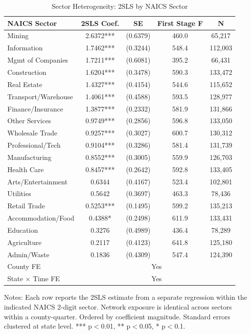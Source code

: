 \begin{table}[H]
\centering
\caption{Sector Heterogeneity: 2SLS by NAICS Sector}
\label{tab:sectorhet}
\small
\begin{tabular}{l cccc}
\toprule
NAICS Sector & 2SLS Coef. & SE & First Stage F & N \\
\midrule
Mining & 2.6372*** & (0.6379) & 460.0 & 65,217 \\
Information & 1.7462*** & (0.3244) & 548.4 & 112,003 \\
Mgmt of Companies & 1.7211*** & (0.6081) & 395.2 & 66,431 \\
Construction & 1.6204*** & (0.3478) & 590.3 & 133,472 \\
Real Estate & 1.4327*** & (0.4154) & 544.6 & 115,652 \\
Transport/Warehouse & 1.4061*** & (0.4588) & 593.5 & 128,977 \\
Finance/Insurance & 1.3877*** & (0.2332) & 581.9 & 131,866 \\
Other Services & 0.9749*** & (0.2856) & 596.8 & 133,050 \\
Wholesale Trade & 0.9257*** & (0.3027) & 600.7 & 130,312 \\
Professional/Tech & 0.9104*** & (0.3286) & 581.4 & 131,739 \\
Manufacturing & 0.8552*** & (0.3005) & 559.9 & 126,703 \\
Health Care & 0.8457*** & (0.2642) & 592.8 & 133,405 \\
Arts/Entertainment & 0.6344 & (0.4167) & 523.4 & 102,801 \\
Utilities & 0.5642 & (0.3697) & 463.3 & 78,436 \\
Retail Trade & 0.5253*** & (0.1495) & 599.2 & 135,213 \\
Accommodation/Food & 0.4388* & (0.2498) & 611.9 & 133,431 \\
Education & 0.3276 & (0.4989) & 436.4 & 78,289 \\
Agriculture & 0.2117 & (0.4123) & 641.8 & 125,180 \\
Admin/Waste & 0.1836 & (0.4309) & 547.4 & 124,390 \\
\midrule
County FE & \multicolumn{4}{c}{Yes} \\
State $\times$ Time FE & \multicolumn{4}{c}{Yes} \\
\bottomrule
\end{tabular}
\begin{figurenotes}
Notes: Each row reports the 2SLS estimate from a separate regression within the indicated 
NAICS 2-digit sector. Network exposure is identical across sectors within a county-quarter. 
Ordered by coefficient magnitude. Standard errors clustered at state level. 
*** p$<$0.01, ** p$<$0.05, * p$<$0.1.
\end{figurenotes}
\end{table}
